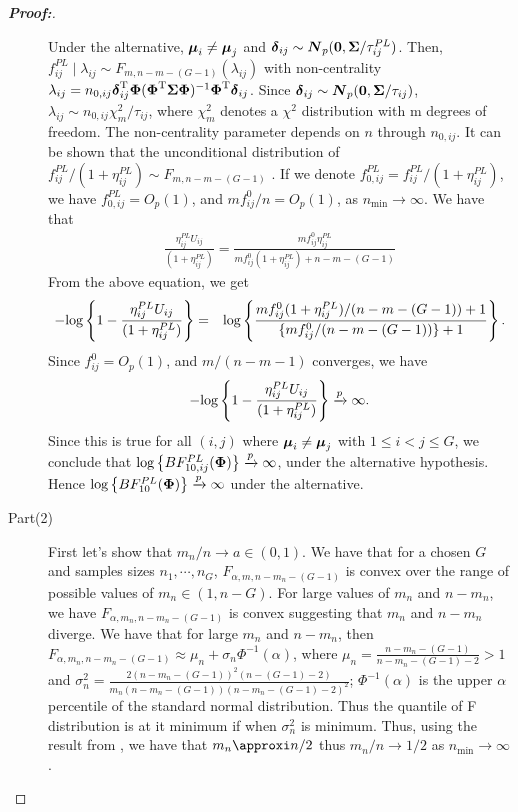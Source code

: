 \documentclass[times,sort&compress,3p]{elsarticle}
\theoremstyle{plain}%
\theoremstyle{definition}
\def\log{\hbox{log}}
\def\log{\hbox{log}}
\def\bse{\begin{eqnarray*}}
\def\ese{\end{eqnarray*}}
\def\be{\begin{eqnarray}}
\def\ee{\end{eqnarray}}
\def\trans{^{\rm T}}
\newcommand{\uN}       {\mbox{\boldmath$N$}}
\newcommand{\udelta}            {\mbox{\boldmath$\delta$}}
\newcommand{\umu}               {\mbox{\boldmath$\mu$}}
\newcommand{\uSigma}            {\mbox{\boldmath$\Sigma$}}
\newcommand{\uPhi}              {\mbox{\boldmath$\Phi$}}
\begin{document}
\begin{proof}[\textbf{\upshape Proof:}]
\begin{description}
Under the alternative, $\umu_{i} \neq \umu_{j}$ and $\udelta_{ij} \sim \uN_{p}({\bf 0}, \uSigma /\tau^{PL}_{ij})$.
Then, $f_{ij}^{PL} \mid   \lambda_{ij} \sim F_{m, n-m-(G-1)}(\lambda_{ij})$
with non-centrality $\lambda_{ij} = n_{0,ij}\udelta_{ij}\trans\uPhi(\uPhi\trans \uSigma \uPhi)^{-1}\uPhi\trans \udelta_{ij}$.
Since $\udelta_{ij} \sim \uN_{p}({\bf 0}, \uSigma /\tau_{ij})$, $\lambda_{ij} \sim n_{0,ij}\chi_{m}^{2}/\tau_{ij}$,
where $\chi_{m}^{2}$ denotes a $\chi^{2}$ distribution with m degrees of freedom. The non-centrality parameter depends on $n$ through $n_{0,ij}$.
It can be shown that the unconditional distribution of $f_{ij}^{PL} /(1 + \eta^{PL}_{ij}) \sim F_{m, n-m-(G-1)}$ \citep[see for reference][page 704]{johnson2005bayes}.
If we denote $f_{0,ij}^{PL} =  f_{ij}^{PL} /(1 + \eta^{PL}_{ij})$, we have $f^{PL}_{0,ij} = O_{p}(1)$, and $mf_{ij}^{0}/n = O_{p}(1)$, as $n_{\min} \rightarrow \infty$.
We have that
\be
\frac{\eta^{PL}_{ij} U_{ij}}{(1+\eta^{PL}_{ij})} = \frac{ m f_{ij}^{0}\eta^{PL}_{ij}}{m f_{ij}^{0}(1+\eta^{PL}_{ij})+n-m-(G-1)} \nonumber
\ee
From the above equation, we get
\be
-\log\left\{ 1 - \frac{\eta^{PL}_{ij} U_{ij}}{(1+\eta^{PL}_{ij})} \right \} &=& \log\left\{ \frac{mf_{ij}^{0}(1+\eta^{PL}_{ij})/(n-m-(G-1)) + 1}{\{mf_{ij}^{0}/(n-m-(G-1))\} +1 }\right\}. \nonumber
\ee
Since $f_{ij}^{0} = O_{p}(1)$, and $m/(n-m-1)$ converges, we have
\bse
 -\log\left\{ 1 - \frac{\eta^{PL}_{ij} U_{ij}}{(1+\eta^{PL}_{ij})} \right \} \xrightarrow[]{p} \infty.
\ese
Since this is true for all $(i,j)$ where $\umu_i \neq \umu_j$ with $1 \leq i < j \leq G$, we conclude that $\log\left\{BF^{PL}_{10,ij}(\uPhi) \right \} \xrightarrow[]{p} \infty$, under the alternative hypothesis. Hence $\log\left\{BF^{PL}_{10}(\uPhi) \right \} \xrightarrow[]{p} \infty$ under the alternative. 

\item[Part(2)] First let's show that $m_n/n \rightarrow a \in (0, 1)$. 
We have that for a chosen $G$ and samples sizes $n_1, \cdots, n_{G}$,  $F_{\alpha, m, n-m_n-(G-1)}$ is convex over the range of possible values of $m_n \in (1, n-G)$. For large values of $m_n$ and $n - m_n$, we have $F_{\alpha, m_n, n-m_n-(G-1)}$ is convex suggesting that $m_n$ and $n-m_n$ diverge. 
We have that for large $m_n$ and $n-m_n$, then $F_{\alpha, m_n, n-m_n-(G-1)} \approx \mu_n + \sigma_n\Phi^{-1}(\alpha)$, where $\mu_n = \frac{n-m_n-(G-1)}{n-m_n-(G-1) - 2} > 1$ and $\sigma^2_n = \frac{2(n-m_n-(G-1))^2 (n-(G-1)-2)}{m_n(n-m_n-(G-1))(n-m_n-(G-1)-2)^2}$; $\Phi^{-1}(\alpha)$ is the upper $\alpha$ percentile of the standard normal distribution. Thus the quantile of F distribution is at it minimum if when $\sigma^2_n$ is minimum. Thus, using the result from \cite{zoh2018powerful}, we have that $m_n \approxi n/2$ thus $m_n/n \rightarrow 1/2$ as $n_{\min} \rightarrow \infty$. 


\end{description}
\end{proof}
\end{document}
